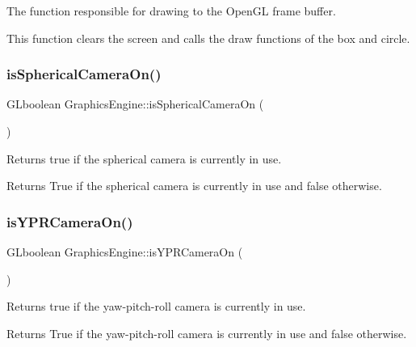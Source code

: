 The function responsible for drawing to the Open\+GL frame buffer. 

This function clears the screen and calls the draw functions of the box and circle. \mbox{\label{class_graphics_engine_a45375adf56d4769b0f33206dc760a1f6}} 
\subsubsection{\texorpdfstring{is\+Spherical\+Camera\+On()}{isSphericalCameraOn()}}
{\footnotesize\ttfamily G\+Lboolean Graphics\+Engine\+::is\+Spherical\+Camera\+On (\begin{DoxyParamCaption}{ }\end{DoxyParamCaption})}



Returns true if the spherical camera is currently in use. 

\begin{DoxyReturn}{Returns}
True if the spherical camera is currently in use and false otherwise. 
\end{DoxyReturn}
\mbox{\label{class_graphics_engine_a8ed6b779b8696620241ba701afd6de67}} 
\subsubsection{\texorpdfstring{is\+Y\+P\+R\+Camera\+On()}{isYPRCameraOn()}}
{\footnotesize\ttfamily G\+Lboolean Graphics\+Engine\+::is\+Y\+P\+R\+Camera\+On (\begin{DoxyParamCaption}{ }\end{DoxyParamCaption})}



Returns true if the yaw-\/pitch-\/roll camera is currently in use. 

\begin{DoxyReturn}{Returns}
True if the yaw-\/pitch-\/roll camera is currently in use and false otherwise. 
\end{DoxyReturn}
\mbox{\label{class_graphics_engine_a687536e27a54ba4abc38db5630b5b2cb}} 
